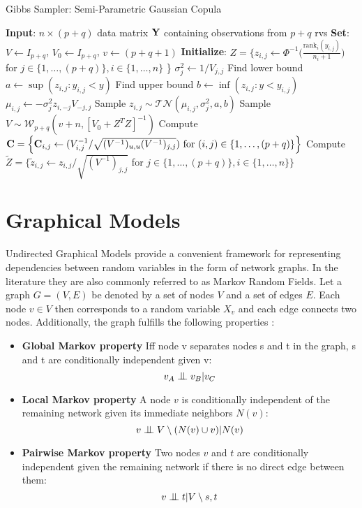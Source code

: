 \begin{algorithm}[]
	\caption{Gibbs Sampler: Semi-Parametric Gaussian Copula}\label{alg:copula}
	\begin{algorithmic}
		\State \textbf{Input}: $n \times (p+q)$ data matrix $\mathbf{Y}$ containing observations from $p+q$ rvs
		\State \textbf{Set}:
		$V \gets I_{p+q}$, 
		$V_0 \gets I_{p+q}$, 
		$v \gets (p+q+1)$
		\State \textbf{Initialize}:
		${{Z}} = 
		\Big\{
		{z}_{i,j} \gets \Phi^{-1}
		\Big(\frac{\text{rank}_i(y_{i,j})}{n_i+1} \Big)$ for $j\in \{1,\dots,(p+q)\}, i \in \{1,\dots,n\}$
		\Big\}
		\Repeat
		\State $\sigma^2_j \gets 1/V_{j,j}$
		\State Find lower bound $a \gets \sup(z_{i,j} : y_{i,j} < y)$
		\State Find upper bound $b \gets \inf(z_{i,j} : y<y_{i,j})$
		\State $\mu_{i,j} \gets -\sigma_j^2 z_{i,-j}V_{-j,j}$
		\State Sample $z_{i,j} \sim \mathcal{TN}(\mu_{i,j}, \sigma_j^2, a, b)$
		\EndFor
		\EndFor
		\EndFor
		\State Sample $V\sim \mathcal{W}_{p+q}(v+n, [V_0 + Z^T Z]^{-1})$
		\State Compute $\mathbf{C} = \Big\{ 
		\mathbf{C}_{i,j}\gets (V^{-1}_{i,j} / \sqrt{(V^{-1})_{u,u} (V^{-1})_{j,j}})
		\text{ for } (i,j) \in \{1,\dots,(p+q)\}
		\Big\}$
		\State Compute $\tilde{Z} = \Big\{ 
		\tilde{z}_{i,j} \gets z_{i,j} / \sqrt{(V^{-1})_{j,j}}$
		for $j\in \{1,\dots,(p+q)\}, i \in \{1,\dots,n\}\Big\}$
	\end{algorithmic}
\end{algorithm}

\FloatBarrier


\section{Graphical Models}
\label{section:graphmodels}
Undirected Graphical Models provide a convenient framework for representing dependencies between random variables in the form of network graphs.
In the literature they are also commonly referred to as Markov Random Fields. 
Let a graph $G = (V,E)$ be denoted by a set of nodes $V$ and a set of edges $E$.
Each node $v\in V$ then corresponds to a random variable $X_v$ and each edge connects two nodes.
Additionally, the graph fulfills the following properties \cite[Chapter 19.2]{Murphy2013Machine}:
\begin{itemize}
	\item \textbf{Global Markov property} Iff node v separates nodes s and t in the graph, s and t are conditionally independent given v:
	      $$v_A \bigCI v_B | v_C$$ 
	\item \textbf{Local Markov property} A node $v$ is conditionally independent of the remaining network given its immediate neighbors $N(v)$: 
	      $$v \bigCI V\setminus(N(v)\cup v) | N(v)$$
	\item \textbf{Pairwise Markov property} Two nodes $v$ and $t$ are conditionally independent given the remaining network if there is no direct edge between them:
	      $$v\bigCI t|V\setminus{s,t}$$
\end{itemize}


